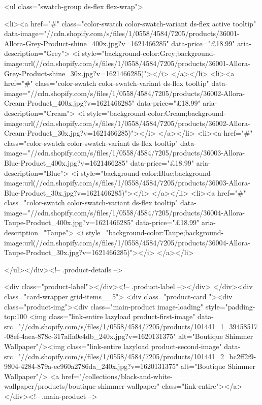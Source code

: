 {{{{{{{<ul class="swatch-group ds-flex flex-wrap">
        
<li><a href="#" class="color-swatch color-swatch-variant ds-flex active tooltip" data-image="//cdn.shopify.com/s/files/1/0558/4584/7205/products/36001-Allora-Grey-Product-shine_400x.jpg?v=1621466285" data-price="£18.99" aria-description="Grey">
              <i style="background-color:Grey;background-image:url(//cdn.shopify.com/s/files/1/0558/4584/7205/products/36001-Allora-Grey-Product-shine_30x.jpg?v=1621466285)"></i>
            </a></li>
<li><a href="#" class="color-swatch color-swatch-variant ds-flex tooltip" data-image="//cdn.shopify.com/s/files/1/0558/4584/7205/products/36002-Allora-Cream-Product_400x.jpg?v=1621466285" data-price="£18.99" aria-description="Cream">
              <i style="background-color:Cream;background-image:url(//cdn.shopify.com/s/files/1/0558/4584/7205/products/36002-Allora-Cream-Product_30x.jpg?v=1621466285)"></i>
            </a></li>
<li><a href="#" class="color-swatch color-swatch-variant ds-flex tooltip" data-image="//cdn.shopify.com/s/files/1/0558/4584/7205/products/36003-Allora-Blue-Product_400x.jpg?v=1621466285" data-price="£18.99" aria-description="Blue">
              <i style="background-color:Blue;background-image:url(//cdn.shopify.com/s/files/1/0558/4584/7205/products/36003-Allora-Blue-Product_30x.jpg?v=1621466285)"></i>
            </a></li>
<li><a href="#" class="color-swatch color-swatch-variant ds-flex tooltip" data-image="//cdn.shopify.com/s/files/1/0558/4584/7205/products/36004-Allora-Taupe-Product_400x.jpg?v=1621466285" data-price="£18.99" aria-description="Taupe">
              <i style="background-color:Taupe;background-image:url(//cdn.shopify.com/s/files/1/0558/4584/7205/products/36004-Allora-Taupe-Product_30x.jpg?v=1621466285)"></i>
            </a></li>

      </ul></div><!-- .product-details -->

<div class="product-label"></div><!-- .product-label --></div>
          </div><div class="card-wrapper grid-items__5">
            <div class="product-card "><div class="product-img"><div class="main-product image-loading" style="padding-top:100%
      <img class="link-entire lazyload product-first-image" data-src="//cdn.shopify.com/s/files/1/0558/4584/7205/products/101441_1_39458517-08ef-4aea-878c-317affa0e4db_240x.jpg?v=1620131375" alt="Boutique Shimmer Wallpaper"/><img class="link-entire lazyload product-second-image" data-src="//cdn.shopify.com/s/files/1/0558/4584/7205/products/101441_2_bc2ff2f9-9804-4284-879a-ec960a2786da_240x.jpg?v=1620131375" alt="Boutique Shimmer Wallpaper"/>
      <a href="/collections/black-and-white-wallpaper/products/boutique-shimmer-wallpaper" class="link-entire"></a>
    </div><!-- .main-product -->
  
}}}}}}}

